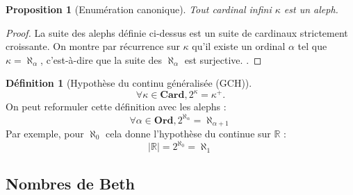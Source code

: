 \documentclass[french]{article}
\theoremstyle{definition}
\newtheorem{definition}[subsubsection]{Définition}
\theoremstyle{plain}
\newtheorem{proposition}[subsubsection]{Proposition}
\theoremstyle{plain}
\theoremstyle{plain}
\theoremstyle{plain}
\theoremstyle{plain}
\begin{document}
\begin{proposition}[Enumération canonique]
	Tout cardinal infini \( \kappa \) est un aleph.
\end{proposition}

\begin{proof}
La suite des alephs définie ci-dessus est un suite de cardinaux strictement croissante. On montre par récurrence sur \( \kappa \) qu'il existe un ordinal \( \alpha \) tel que \( \kappa = \aleph_{\alpha} \), c'est-à-dire que la suite des \( \aleph_{\alpha} \) est surjective. \cite{dehornoy2017théorie}.
\end{proof}

\begin{definition}[Hypothèse du continu généralisée (GCH)]
	\begin{equation}\label{eq:GCH1} \tag{GCH1} 
		\forall{\kappa \in \textbf{Card} }, 2^{\kappa} = \kappa^{+}.
	\end{equation}
On peut reformuler cette définition avec les alephs :
	\begin{equation}\label{eq:GCH2} \tag{GCH2}
	\forall{\alpha \in \textbf{Ord}}, 2^{\aleph_{\alpha}} = \aleph_{\alpha+1} 
	\end{equation}
Par exemple, pour \( \aleph_{0} \) cela donne l'hypothèse du continue sur \( \mathbb{R} \) :
	\begin{equation}\label{eq:HC} \tag{HC}
	|\mathbb{R}| = 2^{\aleph_{0}} = \aleph_{1} 
	\end{equation}

\end{definition}

\subsection{Nombres de Beth}
\end{document}
